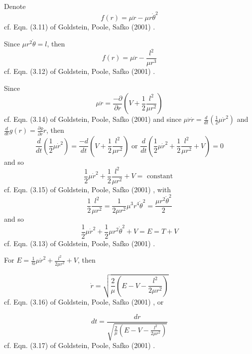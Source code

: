 \documentclass[10pt]{amsart}
\begin{document}
\begin{multicols*}{2}
Denote 
\begin{equation}
f(r) = \mu \ddot{r} - \mu r\dot{\theta}^2
\end{equation}
cf. Eqn. (3.11) of  Goldstein, Poole, Safko (2001) \cite{GPS2001}.

Since $\mu r^2 \dot{\theta} = l$, then
\begin{equation}
f(r) = \mu \ddot{r} - \frac{l^2}{\mu r^3}
\end{equation}
cf. Eqn. (3.12) of Goldstein, Poole, Safko (2001) \cite{GPS2001}.

Since 
\begin{equation}
\mu \ddot{r} = \frac{- \partial}{\partial r} \left( V + \frac{1}{2} \frac{l^2 }{\mu r^2} \right)
\end{equation}
cf. Eqn. (3.14) of Goldstein, Poole, Safko (2001) \cite{GPS2001} and since $\mu \ddot{r} \dot{r} = \frac{d}{dt} \left( \frac{1}{2} \mu \dot{r}^2 \right)$ and $\frac{d}{dt} g(r) = \frac{\partial g}{\partial r} \dot{r}$, then
\[
\frac{d}{dt} \left( \frac{1}{2} \mu \dot{r}^2 \right) = \frac{-d}{dt} \left( V + \frac{1}{2} \frac{l^2 }{ \mu r^2 } \right) \text{ or } \frac{d}{dt} \left( \frac{1}{2} \mu \dot{r}^2 + \frac{1}{2} \frac{l^2}{ \mu r^2 } + V \right) = 0
\]
and so
\begin{equation}
\frac{1}{2} \mu \dot{r}^2 + \frac{1}{2} \frac{l^2}{ \mu r^2} + V = \text{ constant } 
\end{equation}
cf. Eqn. (3.15) of  Goldstein, Poole, Safko (2001) \cite{GPS2001}, with
\[
\frac{1}{2} \frac{l^2 }{\mu r^2 } = \frac{1}{2 \mu r^2} \mu^3 r^4 \dot{\theta}^2 = \frac{\mu r^2 \dot{\theta}^2 }{2} 
\]
and so
\begin{equation}
\frac{1}{2} \mu \dot{r}^2 + \frac{1}{2} \mu r^2 \dot{\theta}^2 + V = E = T+V 
\end{equation}
cf. Eqn. (3.13) of  Goldstein, Poole, Safko (2001) \cite{GPS2001}.

For $E = \frac{1}{@} \mu \dot{r}^2 + \frac{l^2}{2\mu r^2 } + V$, then 

\begin{equation}
\dot{r} = \sqrt{ \frac{2}{\mu} \left( E - V - \frac{l^2}{2 \mu r^2}  \right)  }
\end{equation}
cf. Eqn. (3.16)  of Goldstein, Poole, Safko (2001) \cite{GPS2001}, or 

\begin{equation}
dt =\frac{dr}{ \sqrt{ \frac{2}{\mu} \left( E - V - \frac{l^2}{2 \mu r^2 } \right) } }
\end{equation}
cf. Eqn. (3.17) of  Goldstein, Poole, Safko (2001) \cite{GPS2001}.


\end{multicols*}
\end{document}

